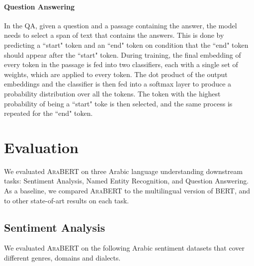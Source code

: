 \documentclass[10pt, a4paper]{article}
\begin{document}
\paragraph{Question Answering}
In the QA, given a question and a passage containing the answer, the model needs to select a span of text that contains the answers. This is done by predicting a ``start" token and an ``end" token on condition that the ``end" token should appear after the ``start" token. During training, the final embedding of every token in the passage is fed into two classifiers, each with a single set of weights, which are applied to every token. The dot product of the output embeddings and the classifier is then fed into a softmax layer to produce a probability distribution over all the tokens. The token with the highest probability of being a ``start" toke is then selected, and the same process is repeated for the ``end" token. \section{Evaluation}
\label{sec:evaluation}

We evaluated \textsc{AraBERT} on three Arabic language understanding downstream tasks: Sentiment Analysis, Named Entity Recognition, and Question Answering.  As a baseline, we compared \textsc{AraBERT} to the multilingual version of BERT, and to other state-of-art results on each task.

\subsection{Sentiment Analysis}
We evaluated \textsc{AraBERT} on the following Arabic sentiment datasets that cover different genres, domains and dialects.
\end{document}
